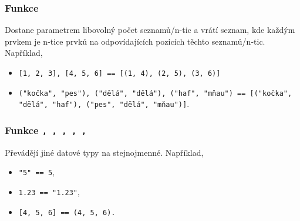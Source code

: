 \begin{frame}
 \frametitle{Funkce \texttt{}}
 \begin{block}{Dostane parametrem libovolný počet seznamů/n-tic a vrátí seznam,
  kde každým prvkem je n-tice prvků na odpovídajících pozicích těchto
  seznamů/n-tic.}
  \pause
  \vspace{1ex}
  Například,
  \begin{itemize}
   \item<1-> \texttt{[1, 2, 3], [4, 5, 6]\mlb{)} == [(1, 4), (2, 5),
    (3, 6)]}
   \item<2-> \texttt{("kočka", "pes"), ("dělá", "dělá"), ("haf",
    "mňau")\mlb{)} == [("kočka", "dělá", "haf"), ("pes", "dělá", "mňau")]}.
  \end{itemize}
 \end{block}
\end{frame}

\begin{frame}
 \frametitle{Funkce \texttt{, , , ,
 , }}
 \begin{block}{Převádějí jiné datové typy na stejnojmenné.}
  \pause
  \vspace{1ex}
  Například,
  \begin{itemize}
   \item \texttt{"5"\mlb{)} == 5},
   \item \texttt{1.23\mlb{)} == "1.23"},
   \item \texttt{[4, 5, 6]\mlb{)} == (4, 5, 6).}
  \end{itemize}
 \end{block}
\end{frame}
